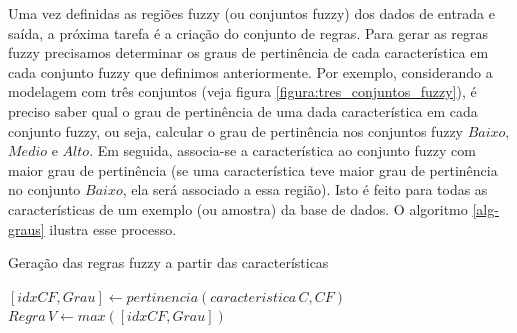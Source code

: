 \documentclass[template.tex]{subfiles}
\begin{document}
Uma vez definidas as regiões fuzzy (ou conjuntos fuzzy) dos dados de entrada e saída, a próxima tarefa é a criação do conjunto de regras. Para gerar as regras fuzzy precisamos determinar os graus de pertinência de cada característica em cada conjunto fuzzy que definimos anteriormente. Por exemplo, considerando a modelagem com três conjuntos (veja figura \ref{figura:tres_conjuntos_fuzzy}), é preciso saber qual o grau de pertinência de uma dada característica em cada conjunto fuzzy, ou seja, calcular o grau de pertinência nos conjuntos fuzzy $Baixo$, $Medio$ e $Alto$. Em seguida, associa-se a característica ao conjunto fuzzy com maior grau de pertinência (se uma característica teve maior grau de pertinência no conjunto $Baixo$, ela será associado a essa região). Isto é feito para todas as características de um exemplo (ou amostra) da base de dados. O algoritmo \ref{alg-graus} ilustra esse processo.

%


\begin{algorithm}
\begin{algorithmic}[1]
\caption{Geração das regras fuzzy a partir das características}
\label{alg-graus}
      \STATE $[idxCF,Grau] \leftarrow pertinencia(caracteristica\,C,CF)$
      \ENDFOR
   \STATE $Regra \, V \leftarrow max([idxCF,Grau]) $
   \ENDFOR
\ENDFOR
\end{algorithmic}
\end{algorithm}
\end{document}
